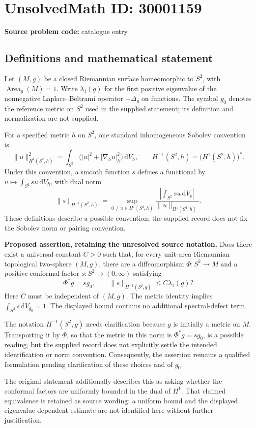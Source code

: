 \documentclass[11pt]{article}
\begin{document}
\section*{UnsolvedMath ID: 30001159}
\textbf{Source problem code:} catalogue entry
\subsection{Definitions and mathematical statement}
Let \((M,g)\) be a closed Riemannian surface homeomorphic to \(S^2\), with \(\operatorname{Area}_g(M)=1\). Write \(\lambda_1(g)\) for the first positive eigenvalue of the nonnegative Laplace--Beltrami operator \(-\Delta_g\) on functions. The symbol \(g_0\) denotes the reference metric on \(S^2\) used in the supplied statement; its definition and normalization are not supplied.

For a specified metric \(h\) on \(S^2\), one standard inhomogeneous Sobolev convention is
\[
\|u\|_{H^1(S^2,h)}^2=\int_{S^2}\bigl(|u|^2+|\nabla_hu|_h^2\bigr)\,\mathrm dV_h,
\qquad H^{-1}(S^2,h)=\bigl(H^1(S^2,h)\bigr)^*.
\]
Under this convention, a smooth function \(s\) defines a functional by \(u\mapsto\int_{S^2}su\,\mathrm dV_h\), with dual norm
\[
\|s\|_{H^{-1}(S^2,h)}=\sup_{0\ne u\in H^1(S^2,h)}\frac{\left|\int_{S^2}su\,\mathrm dV_h\right|}{\|u\|_{H^1(S^2,h)}}.
\]
These definitions describe a possible convention; the supplied record does not fix the Sobolev norm or pairing convention.

\textbf{Proposed assertion, retaining the unresolved source notation.} Does there exist a universal constant \(C>0\) such that, for every unit-area Riemannian topological two-sphere \((M,g)\), there are a diffeomorphism \(\Phi:S^2\to M\) and a positive conformal factor \(s:S^2\to(0,\infty)\) satisfying
\[
\Phi^*g=s g_0,
\qquad
\|s\|_{H^{-1}(S^2,g)}\le C\lambda_1(g)?
\]
Here \(C\) must be independent of \((M,g)\). The metric identity implies \(\int_{S^2}s\,\mathrm dV_{g_0}=1\). The displayed bound contains no additional spectral-defect term.

The notation \(H^{-1}(S^2,g)\) needs clarification because \(g\) is initially a metric on \(M\). Transporting it by \(\Phi\), so that the metric in this norm is \(\Phi^*g=s g_0\), is a possible reading, but the supplied record does not explicitly settle the intended identification or norm convention. Consequently, the assertion remains a qualified formulation pending clarification of these choices and of \(g_0\).

The original statement additionally describes this as asking whether the conformal factors are uniformly bounded in the dual of \(H^1\). That claimed equivalence is retained as source wording: a uniform bound and the displayed eigenvalue-dependent estimate are not identified here without further justification.
\end{document}
